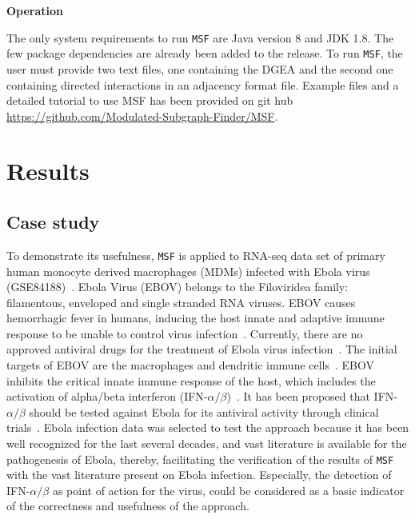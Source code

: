 \documentclass[10pt,a4paper,twocolumn]{article}
\begin{document}
	\textbf{Operation}
	
	The only system requirements to run \texttt{MSF} are Java version 8 and JDK 1.8. The few package
		dependencies are already been added to the release. To run
		\texttt{MSF}, the user must provide two text files, one containing the
		DGEA and the second one containing
        directed interactions in an adjacency format file. Example
        files and a detailed tutorial to use MSF has been provided on
        git hub \url{https://github.com/Modulated-Subgraph-Finder/MSF}.
	
	
	\section*{Results}
	
	\subsection*{Case study}
	
	To demonstrate its usefulness, \texttt{MSF} is applied to
        RNA-seq data set of primary human monocyte derived macrophages
        (MDMs) infected with Ebola virus (GSE84188)~\cite{Olejnik}. Ebola Virus (EBOV) belongs to the
        Filoviridea family: filamentous, enveloped and single stranded
        RNA viruses. EBOV causes hemorrhagic fever in humans, inducing
        the host innate and adaptive immune response to be unable to
        control virus infection~\cite{Prins}. Currently, there are no
        approved antiviral drugs for the treatment of Ebola virus
        infection~\cite{Konde,Rhein}.  The initial targets of EBOV are
        the macrophages and dendritic immune
        cells~\cite{Falasca,Rhein}. EBOV inhibits the critical innate
        immune response of the host, which includes the activation of
        alpha/beta interferon (IFN-$\alpha /
        \beta$)~\cite{Prins,Konde,Cardenas}. It has been proposed that
        IFN-$\alpha / \beta$ should be tested against Ebola for its
        antiviral activity through clinical trials~\cite{Konde}. Ebola
        infection data was selected to test the approach because it
        has been well recognized for the last several decades, and
        vast literature is available for the pathogenesis of Ebola,
        thereby, facilitating the verification of the results of
        \texttt{MSF} with the vast literature present on Ebola
        infection. Especially, the detection of IFN-$\alpha / \beta$
        as point of action for the virus, could be considered as a
        basic indicator of the correctness and usefulness of the
        approach.
	
\end{document}
